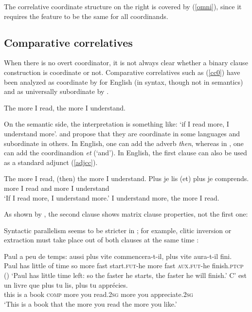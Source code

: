 The correlative coordinate structure on the right is covered by (\ref{omni}), since it requires the \coord feature to be the same for all coordinands. 



\subsection{Comparative correlatives}



When there is no overt coordinator, it is not always clear whether a binary clause construction is coordinate or not. Comparative correlatives such as (\ref{cc0}) have been analyzed as coordinate by \citet{culijack} for English (in syntax, though not in semantics) and as universally subordinate  by \citet{dikken}. 

\ea
The more I read, the more I understand. \label{cc0}
\z

On the semantic side, the interpretation is something like: `if I read more, I understand
more'. \citet{Abeille:06} and \citet{Abeille:Borsley:08} propose that they are  coordinate in some languages 
 and subordinate in others. In English, one can add the adverb \emph{then}, whereas in , one can add the coordinandion \emph{et} (`and'). In English, the first clause can also be used as a standard adjunct (\ref{adjcc}).
 
\eal
\label{adjcc}
\ex The more I read, (then) the more I understand.
\ex 
\gll Plus je lis (et) plus je comprends.\\
     more I read and more I understand\\
\glt `If I read more, I understand more.'
\ex I understand more, the more I read.
\zl


As shown by \citet[549--550]{culijack}, the second clause shows matrix clause properties, not the first one:

\eal
{}
\zl

Syntactic parallelism seems to be stricter in ; for example, clitic inversion or extraction
must take place out of both clauses at the same time \citep[]{Abeille:Borsley:08}:

\eal
\ex 
\gll Paul a     peu  de temps: aussi plus  vite commencera-t-il,  plus   vite  aura-t-il  fini.\\
     Paul has little of time so more fast start.\textsc{fut}-he more fast  \textsc{aux}.\textsc{fut}-he finish.\textsc{ptcp} \\\hfill{()}
\glt `Paul has little time left: so the faster he starts, the faster he will finish.'
\ex \gll C'   est un livre  que      plus   tu    lis, plus  tu    appr\'{e}cies. \\
this is    a  book \textsc{comp} more you read.2\textsc{sg}  more you appreciate.2\textsc{sg} \\
\glt `This is a book that the more you read the more you like.'
\zl

